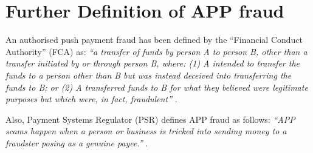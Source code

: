 
\section{Further Definition of APP fraud}\label{sec::APP-fraud-def}


An authorised push payment fraud has been defined by the ``Financial Conduct Authority'' (FCA) as: 
%
\emph{ ``a transfer of funds by person A to person B, other than a transfer initiated by or through person B, where: (1) A intended to transfer the funds to a person other than B but was instead deceived into transferring the funds to B; or (2) A transferred funds to B for what they believed were legitimate purposes but which were, in fact, fraudulent''} \cite{FCA-Glossary}. 

Also, Payment Systems Regulator (PSR) defines APP fraud as follows:  
%
\emph{``APP scams happen when a person or business is tricked into sending money to a fraudster posing as a genuine payee.''} \cite{PSR-APP-def}. 